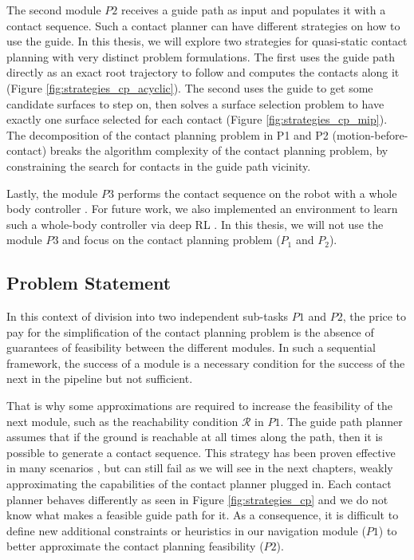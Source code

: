 The second module $P2$ receives a guide path as input and populates it with a contact sequence. Such a contact planner can have different strategies on how to use the guide. In this thesis, we will explore two strategies for quasi-static contact planning with very distinct problem formulations. 
The first uses the guide path directly as an exact root trajectory to follow and computes the contacts along it (Figure \ref{fig:strategies_cp_acyclic}).
The second uses the guide to get some candidate surfaces to step on, then solves a surface selection problem to have exactly one surface selected for each contact (Figure \ref{fig:strategies_cp_mip}).
The decomposition of the contact planning problem in P1 and P2 (motion-before-contact) breaks the algorithm complexity \cite{AcyclicCP,sl1m_v2} of the contact planning problem, by constraining the search for contacts in the guide path vicinity.

Lastly, the module $P3$ performs the contact sequence on the robot with a whole body controller \cite{loco3d, tsid_prete, deepLoco}. For future work, we also implemented an environment to learn such a whole-body controller via deep RL \cite{software_robot_RL}.
In this thesis, we will not use the module $P3$ and focus on the contact planning problem ($P_1$ and $P_2$).


\subsection{Problem Statement\label{subsub:problematic_leas}}

In this context of division into two independent sub-tasks $P1$ and $P2$, the price to pay for the simplification of the contact planning problem is the absence of guarantees of feasibility between the different modules.
In such a sequential framework, the success of a module is a necessary condition for the success of the next in the pipeline but not sufficient.

That is why some approximations are required to increase the feasibility of the next module, such as the reachability condition $\mathcal{R}$ in $P1$. The guide path planner assumes that if the ground is reachable at all times along the path, then it is possible to generate a contact sequence. 
This strategy has been proven effective in many scenarios \cite{AcyclicCP}, but can still fail as we will see in the next chapters, weakly approximating the capabilities of the contact planner plugged in. Each contact planner behaves differently as seen in Figure \ref{fig:strategies_cp} and we do not know what makes a feasible guide path for it. As a consequence, it is difficult to define new additional constraints or heuristics in our navigation module ($P1$) to better approximate the contact planning feasibility ($P2$).

